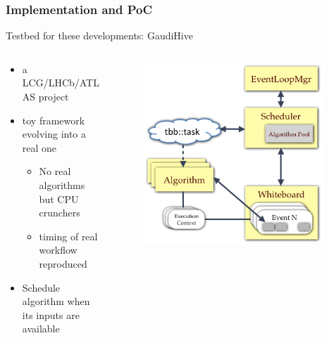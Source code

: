 \documentclass[10pt]{beamer}
\begin{document}
\begin{frame}
\frametitle{Implementation and PoC}
\label{sec-1-9}


Testbed for these developments: \alert{GaudiHive}

  \begin{columns}
    \begin{column}{0.7\textwidth}

      \begin{block}{}
        \begin{itemize}
          \item a LCG/LHCb/ATLAS project
          \item toy framework evolving into a real one
          \begin{itemize}
            \item No real algorithms but CPU crunchers
            \item timing of real workflow reproduced
          \end{itemize}
          \item Schedule algorithm when its inputs are available
        \end{itemize}
      \end{block}

    \end{column}
    \begin{column}{0.35\textwidth}
\begin{figure}
  \begin{center}
    \includegraphics[width=0.95\textwidth]{figs/gaudi-hive.png}
  \end{center}
\end{figure}
    \end{column}
  \end{columns}
\end{frame}
\end{document}
